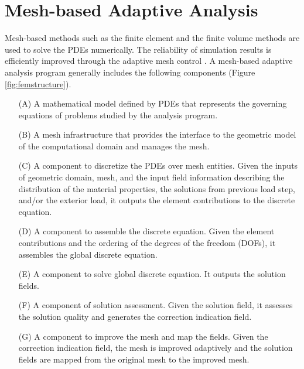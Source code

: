 \documentclass[11pt]{article}  %
\begin{document}
\section{Mesh-based Adaptive Analysis} \label{sec:general}

Mesh-based methods such as the finite element and the finite volume methods are used to solve the PDEs numerically.  The reliability  of simulation results is efficiently improved through the adaptive mesh control \cite{shephardmethods}. A mesh-based adaptive analysis program generally includes the following components (Figure \ref{fig:femstructure}).
\begin{enumerate}
\item[(A)] A mathematical model defined by PDEs that represents the governing equations of problems studied by the analysis program.
\item[(B)] A mesh infrastructure that provides the interface to the geometric model of the computational domain and manages the mesh.
\item[(C)] A component to discretize the PDEs over mesh entities. Given the inputs of geometric domain, mesh, and the input field information describing the distribution of the material properties, the solutions from previous load step, and/or the exterior load, it outputs the element contributions to the discrete equation. 
\item [(D)] A component to assemble the discrete equation. Given the element contributions and  the ordering of the degrees of the freedom (DOFs), it assembles the global discrete equation.
\item[(E)] A component to solve global discrete equation. It outputs the solution fields.
\item[(F)] A component of solution assessment. Given the solution field, it assesses the solution quality and generates the correction indication field.
\item[(G)] A component to improve the mesh and map the fields. Given the correction indication field, the mesh is improved adaptively and the solution fields are mapped from the original mesh to the improved mesh.
\end{enumerate}
\end{document}
